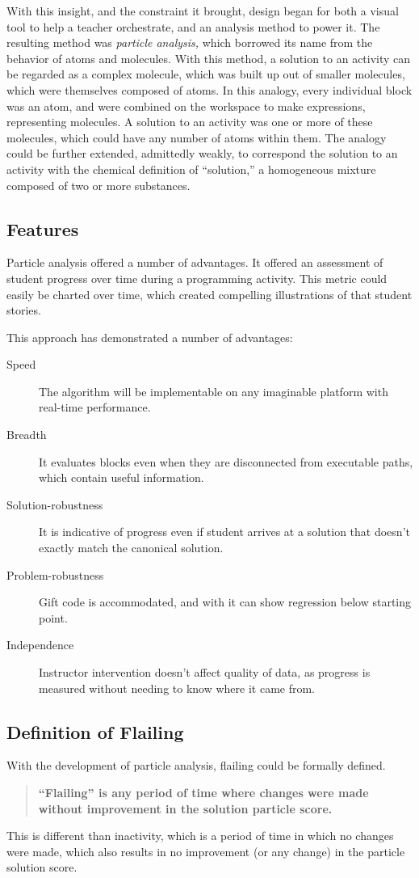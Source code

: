 With this insight, and the constraint it brought, design began for both a visual tool to help a teacher orchestrate, and an analysis method to power it. The resulting method was \emph{particle analysis,} which borrowed its name from the behavior of atoms and molecules. With this method, a solution to an activity can be regarded as a complex molecule, which was built up out of smaller molecules, which were themselves composed of atoms. In this analogy, every individual block was an atom, and were combined on the workspace to make expressions, representing molecules. A solution to an activity was one or more of these molecules, which could have any number of atoms within them. The analogy could be further extended, admittedly weakly, to correspond the solution to an activity with the chemical definition of ``solution,'' a homogeneous mixture composed of two or more substances. 


\subsection{Features}
Particle analysis offered a number of advantages. It offered an assessment of student progress over time during a programming activity. This metric could easily be charted over time, which created compelling illustrations of that student stories. 

This approach has demonstrated a number of advantages:
\begin{description}
\item [Speed] The algorithm will be implementable on any imaginable platform with real-time performance. 
\item [Breadth] It evaluates blocks even when they are disconnected from executable paths, which contain useful information.
\item [Solution-robustness] It is indicative of progress even if student arrives at a solution that doesn't exactly match the canonical solution.
\item [Problem-robustness] Gift code is accommodated, and with it can show regression below starting point.
\item [Independence] Instructor intervention doesn't affect quality of data, as progress is measured without needing to know where it came from.
\end{description}

\subsection{Definition of Flailing}
With the development of particle analysis, flailing could be formally defined. 
\begin{quote}
\textbf{``Flailing'' is any period of time where changes were made without improvement in the solution particle score.}
\end{quote}
This is different than inactivity, which is a period of time in which no changes were made, which also results in no improvement (or any change) in the particle solution score.

